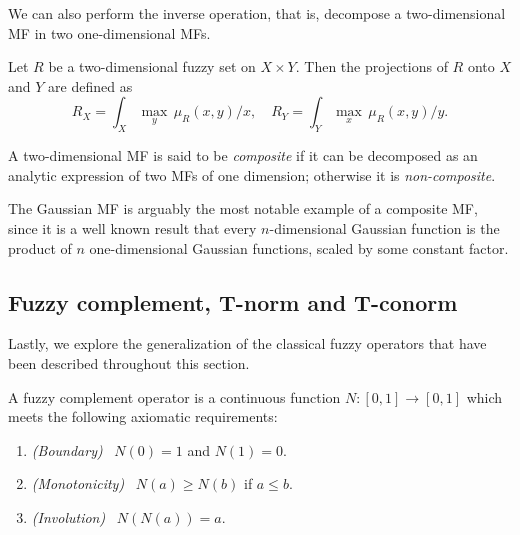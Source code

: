 We can also perform the inverse operation, that is, decompose a two-dimensional MF in two one-dimensional MFs.

\begin{definition}[Projections] Let $R$ be a two-dimensional fuzzy set on $X\times Y$. Then the projections of $R$ onto $X$ and $Y$ are defined as
\[
R_X = \int_X \max_y \, \mu_R(x,y) \slash x, \quad R_Y = \int_Y \max_x \, \mu_R(x,y) \slash y.
\]

\end{definition}

\begin{definition}[Composite MF] A two-dimensional MF is said to be \textit{composite} if it can be decomposed as an analytic expression of two MFs of one dimension; otherwise it is \textit{non-composite}.

\end{definition}

The Gaussian MF is arguably the most notable example of a composite MF, since it is a well known result that every $n$-dimensional Gaussian function is the product of $n$ one-dimensional Gaussian functions, scaled by some constant factor.



\subsection{Fuzzy complement, T-norm and T-conorm} \label{ssec:tnorm}

Lastly, we explore the generalization of the classical fuzzy operators that have been described throughout this section.

\begin{definition} A fuzzy complement operator is a continuous function $N:[0,1] \to [0,1]$ which meets the following axiomatic requirements:

\begin{enumerate}
	\item \textit{(Boundary)} \ $N(0)=1$ and $N(1)=0$.
	\item \textit{(Monotonicity)} \ $N(a) \ge N(b)$ if $a \le b$.
	\item \textit{(Involution)} \ $N(N(a)) = a$.
\end{enumerate}

\end{definition}

